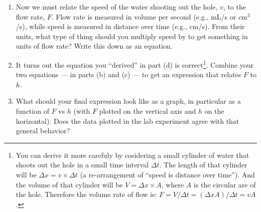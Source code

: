 \documentclass[12pt]{article}
\begin{document}
\begin{enumerate}
\begin{enumerate}
	This says that the sum of the pressure of a fluid, $P$, plus its graviational energy density\footnote{$\rho$ is the {\em mass density of the fluid} (\unit{1}{\gram/\milli\liter}  = \unit{1000}{\kilo\gram/\meter^3} for water); and $g = \unit{10}{\meter/\second^2}$ is the so-called {\em acceleration due to gravity} constant.}, $\rho g h$ , plus its kinetic energy density, $\frac{1}{2} \rho v^2$, is equal at any two points ($A$ and $B$) along a streamline of a fluid.  To apply this to our lab, where the ``fluid'' is the water in the GC, we pick our points $A$ and $B$ to be at the top of water column and where the water shoots out of the hole, respectively.  Because both of these points are exposed to the atmosphere, the fluid pressures are the same: $P_A = P_B = P_\text{atm}$.  Because, at equilibrium, the water level is not changing, what is $v_A$, at the top of the water column?  If we say that the height of the hole is our zero value, $h_B=0$, then $h_A = h$ is simply our ``height above the hole.''  \underline{Make all of these replacements in the above equation} and you should arrive at an equation that relates $v_B$, the speed of water shooting out of the hole, to $h_B$,  the height of the water level above the hole.  We can just call these $v$ and $h$ from now on.
	\item Now we must relate the speed of the water shooting out the hole, $v$, to the flow rate, $F$.  Flow rate is measured in volume per second (e.g., mL/s or $\text{cm}^3$/s), while speed is measured in distance over time (e.g., cm/s).  From their units, what type of thing should you multiply speed by to get something in units of flow rate?  Write this down as an equation.
	\item It turns out the equation you ``derived'' in part (d) is correct\footnote{You can derive it more carefuly by cosidering a small cylinder of water that shoots out the hole in a small time interval $\Delta t$.  The length of that cylinder will be $\Delta x = v \times \Delta t$ (a re-arrangement of ``speed is distance over time'').  And the volume of that cylinder will be $V = \Delta x \times A$, where $A$ is the circular are of the hole.  Therefore the volume rate of flow is: $F = V / \Delta t = \left( \Delta x A \right) / \Delta t = v  A$.}.  Combine your two equations --- in parts (b) and (c) --- to get an expression that relates $F$ to $h$.
	\item What should your final expression look like as a graph, in particular as a function of $F$ vs $h$ (with $F$ plotted on the vertical axis and $h$ on the horizontal). Does the data plotted in the lab experiment agree with that general behavior?

\end{enumerate}
\end{enumerate}
\end{document}

